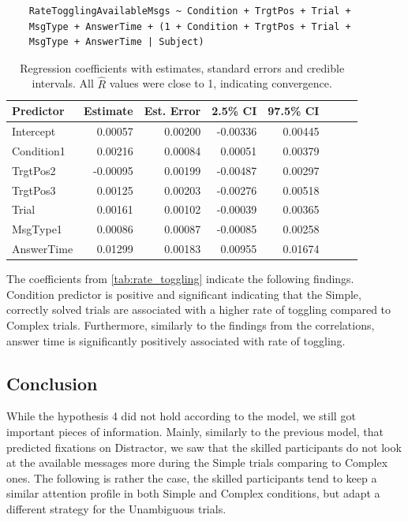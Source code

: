 \begin{verbatim}
    RateTogglingAvailableMsgs ~ Condition + TrgtPos + Trial +
    MsgType + AnswerTime + (1 + Condition + TrgtPos + Trial +
    MsgType + AnswerTime | Subject)
\end{verbatim}

\begin{table}[ht]
\centering
\begin{tabular}{lrrrrrrr}
\hline
\textbf{Predictor} & \textbf{Estimate} & \textbf{Est. Error} & \textbf{2.5\% CI} & \textbf{97.5\% CI} \\
\hline
Intercept   &  0.00057 & 0.00200 & -0.00336 &  0.00445 \\
Condition1  &  0.00216 & 0.00084 &  0.00051 &  0.00379 \\
TrgtPos2    & -0.00095 & 0.00199 & -0.00487 &  0.00297 \\
TrgtPos3    &  0.00125 & 0.00203 & -0.00276 &  0.00518 \\
Trial       &  0.00161 & 0.00102 & -0.00039 &  0.00365 \\
MsgType1    &  0.00086 & 0.00087 & -0.00085 &  0.00258 \\
AnswerTime  &  0.01299 & 0.00183 &  0.00955 &  0.01674 \\
\hline
\end{tabular}
\caption{Regression coefficients with estimates, standard errors and credible intervals. All $\hat{R}$ values were close to 1, indicating convergence.}
\label{tab:rate_toggling}
\end{table}

The coefficients from \autoref{tab:rate_toggling} indicate the following findings. Condition predictor is positive and significant indicating that the Simple, correctly solved trials are associated with a higher rate of toggling compared to Complex trials. Furthermore, similarly to the findings from the correlations, answer time is significantly positively associated with rate of toggling.






\subsection*{Conclusion}
\label{sec:avmsgs_conclusion}
While the hypothesis 4 did not hold according to the model, we still got important pieces of information. Mainly, similarly to the previous model, that predicted fixations on Distractor, we saw that the skilled participants do not look at the available messages more during the Simple trials comparing to Complex ones. The following is rather the case, the skilled participants tend to keep a similar attention profile in both Simple and Complex conditions, but adapt a different strategy for the Unambiguous trials. 







